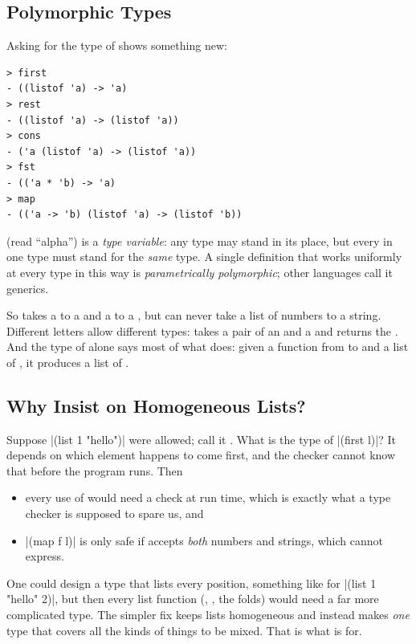 \subsection{Polymorphic Types}

Asking for the type of  shows something new:
\begin{lstlisting}[style=repl]
> first
- ((listof 'a) -> 'a)
> rest
- ((listof 'a) -> (listof 'a))
> cons
- ('a (listof 'a) -> (listof 'a))
> fst
- (('a * 'b) -> 'a)
> map
- (('a -> 'b) (listof 'a) -> (listof 'b))
\end{lstlisting}

\begin{definition}
 (read ``alpha'') is a \emph{type variable}: any type may stand in its place, but every  in one type must stand for the \emph{same} type. A single definition that works uniformly at every type in this way is \emph{parametrically polymorphic}; other languages call it generics.
\end{definition}

So  takes a  to a  and a  to a , but can never take a list of numbers to a string. Different letters allow different types:  takes a pair of an  and a  and returns the . And the type of  alone says most of what  does: given a function from  to  and a list of , it produces a list of .

\subsection{Why Insist on Homogeneous Lists?}

Suppose \rkt|(list 1 "hello")| were allowed; call it . What is the type of \rkt|(first l)|? It depends on which element happens to come first, and the checker cannot know that before the program runs. Then
\begin{itemize}
  \item every use of  would need a check at run time, which is exactly what a type checker is supposed to spare us, and
  \item \rkt|(map f l)| is only safe if  accepts \emph{both} numbers and strings, which  cannot express.
\end{itemize}
One could design a type that lists every position, something like  for \rkt|(list 1 "hello" 2)|, but then every list function (, , the folds) would need a far more complicated type. The simpler fix keeps lists homogeneous and instead makes \emph{one} type that covers all the kinds of things to be mixed. That is what  is for.
